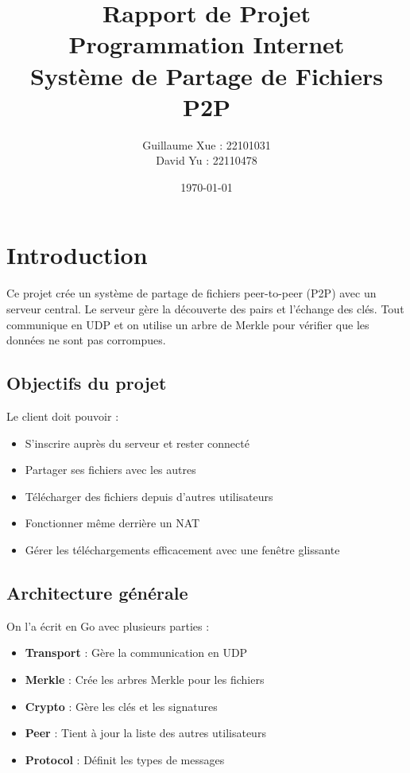 \documentclass[11pt,a4paper]{report}
\title{Rapport de Projet\\Programmation Internet\\Système de Partage de Fichiers P2P}
\author{Guillaume Xue : 22101031 \\ David Yu : 22110478}
\date{\today}
\begin{document}
\maketitle

\tableofcontents

\chapter{Introduction}

Ce projet crée un système de partage de fichiers peer-to-peer (P2P) avec un serveur central. Le serveur gère la découverte des pairs et l'échange des clés. Tout communique en UDP et on utilise un arbre de Merkle pour vérifier que les données ne sont pas corrompues.

\section{Objectifs du projet}

Le client doit pouvoir :
\begin{itemize}
    \item S'inscrire auprès du serveur et rester connecté
    \item Partager ses fichiers avec les autres
    \item Télécharger des fichiers depuis d'autres utilisateurs
    \item Fonctionner même derrière un NAT
    \item Gérer les téléchargements efficacement avec une fenêtre glissante
\end{itemize}

\section{Architecture générale}

On l'a écrit en Go avec plusieurs parties :
\begin{itemize}
    \item \textbf{Transport} : Gère la communication en UDP
    \item \textbf{Merkle} : Crée les arbres Merkle pour les fichiers
    \item \textbf{Crypto} : Gère les clés et les signatures
    \item \textbf{Peer} : Tient à jour la liste des autres utilisateurs
    \item \textbf{Protocol} : Définit les types de messages
\end{itemize}
\end{document}
